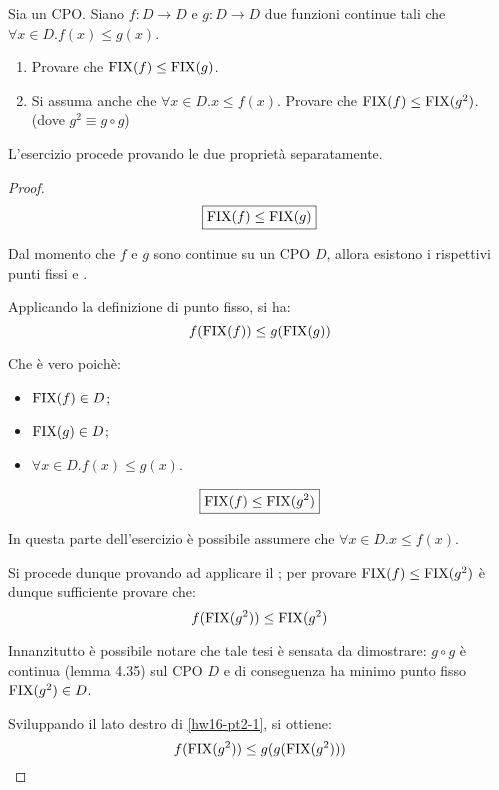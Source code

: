 {
  Sia  un CPO. Siano $f: D \to D$ e $g: D \to D$ due funzioni
  continue tali che $\forall{x}\in D. f(x) \leq{} g(x)$.
  \begin{enumerate}
    \item Provare che $\textrm{\normalfont{FIX}}(f) \leq{} \textrm{\normalfont{FIX}}(g)$.
    \item Si assuma anche che $\forall{x}\in D.x \leq{} f(x)$. Provare che
      $\textrm{\normalfont{FIX}}(f) \leq \textrm{\normalfont{FIX}}(g^2)$. (dove $g^2 \equiv{} g \circ g$)
  \end{enumerate}
}
{}
L'esercizio procede provando le due proprietà separatamente.

\begin{proof}
$$
\boxed{\textrm{\normalfont{FIX}}(f) \leq{} \textrm{\normalfont{FIX}}(g)}
$$

Dal momento che $f$ e $g$ sono continue su un CPO $D$, allora esistono i
rispettivi punti fissi  e .

Applicando la definizione di punto fisso, si ha:
\begin{equation}
  f(\textrm{\normalfont{FIX}}(f)) \leq{} g(\textrm{\normalfont{FIX}}(g))
\end{equation}

Che è vero poichè:
\begin{itemize}
  \item $\textrm{\normalfont{FIX}}(f) \in D$;
  \item $\textrm{\normalfont{FIX}}(g) \in D$;
  \item $\forall{x}\in D. f(x) \leq{} g(x)$.
\end{itemize}

$$
\boxed{\textrm{\normalfont{FIX}}(f) \leq \textrm{\normalfont{FIX}}(g^2)}
$$

In questa parte dell'esercizio è possibile assumere che
$\forall{x}\in D.x \leq{} f(x)$.

Si procede dunque provando ad applicare il \FPIL{}; per provare
$\textrm{\normalfont{FIX}}(f) \leq \textrm{\normalfont{FIX}}(g^2)$ è dunque sufficiente provare che:
\begin{equation}
  f(\textrm{\normalfont{FIX}}(g^2)) \leq{} \textrm{\normalfont{FIX}}(g^2)
  \label{hw16-pt2-1}
\end{equation}

Innanzitutto è possibile notare che tale tesi è sensata da dimostrare:
$g \circ g$ è continua (lemma 4.35) sul CPO $D$ e di conseguenza ha minimo
punto fisso $\textrm{\normalfont{FIX}}(g^2)\in D$.

Sviluppando il lato destro di \ref{hw16-pt2-1}, si ottiene:
\begin{equation}
  f(\textrm{\normalfont{FIX}}(g^2)) \leq{} g(g(\textrm{\normalfont{FIX}}(g^2)))
  \label{hw16-pt2-1}
\end{equation}


\end{proof}
